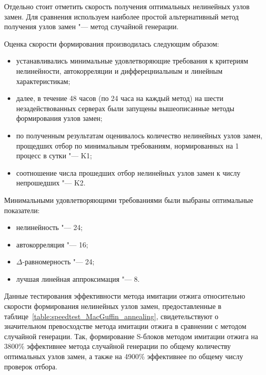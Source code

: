 Отдельно стоит отметить скорость получения оптимальных нелинейных узлов замен.
Для сравнения используем наиболее простой альтернативный метод получения узлов
замен "--- метод случайной генерации.

Оценка скорости формирования производилась следующим образом:
\begin{itemize}

    \item устанавливались минимальные удовлетворяющие требования к критериям
    нелинейности, автокорреляции и дифферецниальным и линейным характеристикам;

    \item далее, в течение 48 часов (по 24 часа на каждый метод) на шести
    незадействованных серверах были запущены вышеописанные методы формирования
    узлов замен;

    \item по полученным результатам оценивалось количество нелинейных узлов
    замен, прощедших отбор по минимальным требованиям, нормированных на 1 процесс
    в сутки "--- K1;

    \item соотношение числа прошедших отбор нелинейных узлов замен к числу
    непрошедших "--- K2.

\end{itemize}

Минимальными удовлетворяющими требованиями были выбраны оптимальные показатели:

\begin{itemize}
    \item нелинейность "--- 24;
    \item автокорреляция "--- 16;
    \item $\Delta$-равномерность "--- 24;
    \item лучшая линейная аппроксимация "--- 8.
\end{itemize}

Данные тестирования эффективности метода имитации отжига относительно скорости
формирования нелинейных узлов замен, предоставленные в
таблице~\ref{table:speedtest_MacGuffin_annealing}, свидетельствуют о
значительном превосходстве метода имитации отжига в сравнении с методом
случайной генерации. Так, формирование S-блоков методом имитации отжига на
3800\% эффективнее метода случайной генерации по общему количеству оптимальных
узлов замен, а также на 4900\% эффективнее по общему числу проверок отбора.

